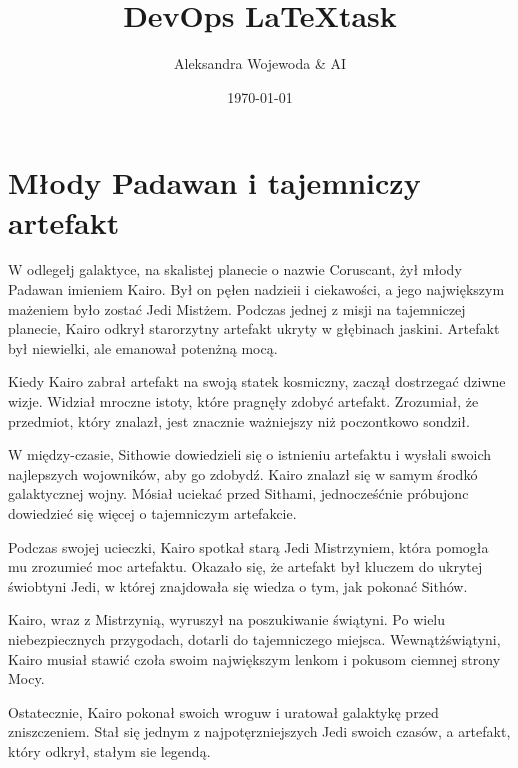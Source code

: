 \documentclass[11pt]{article}
\title{DevOps \LaTeX task}
\author{Aleksandra Wojewoda \& AI}
\date{\today}
\begin{document}
\maketitle  

\pagebreak



\section{Młody Padawan i tajemniczy artefakt}


W odlegełj galaktyce, na skalistej planecie o nazwie Coruscant, żył 
młody Padawan imieniem Kairo. Był on pęłen nadzieii i ciekawości, 
a jego największym mażeniem było zostać Jedi Mistżem. 
Podczas jednej z misji na tajemniczej planecie, Kairo odkrył starorzytny 
artefakt ukryty w głębinach jaskini. 
Artefakt był niewielki, ale emanował potenżną mocą.

Kiedy Kairo zabrał artefakt na swoją statek kosmiczny, zaczął dostrzegać 
dziwne wizje. Widział mroczne istoty, które pragnęły zdobyć artefakt. 
Zrozumiał, że przedmiot, który znalazł, jest znacznie ważniejszy niż 
poczontkowo sondził.

W między-czasie, Sithowie dowiedzieli się o istnieniu artefaktu i wysłali 
swoich najlepszych wojowników, aby go zdobydź. 
Kairo znalazł się w samym środkó galaktycznej wojny. 
Mósiał uciekać przed Sithami, jednocześćnie próbujonc dowiedzieć się 
więcej o tajemniczym artefakcie.

Podczas swojej ucieczki, Kairo spotkał starą Jedi Mistrzyniem,
która pomogła mu zrozumieć moc artefaktu. 
Okazało się, że artefakt był kluczem do ukrytej świobtyni Jedi, 
w której znajdowała się wiedza o tym, jak pokonać Sithów.

Kairo, wraz z Mistrzynią, wyruszył na poszukiwanie świątyni. 
Po wielu niebezpiecznych przygodach, dotarli do tajemniczego miejsca. 
Wewnątżświątyni, Kairo musiał stawić czoła swoim największym lenkom 
i pokusom ciemnej strony Mocy.

Ostatecznie, Kairo pokonał swoich wroguw i uratował galaktykę przed 
zniszczeniem. 
Stał się jednym z najpotęrzniejszych Jedi swoich czasów, 
a artefakt, który odkrył, stałym sie legendą.



\end{document}
